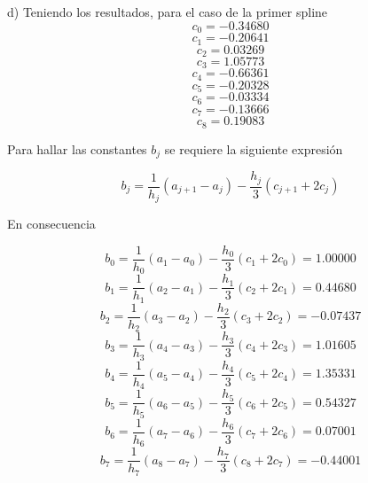 d) Teniendo los resultados, para el caso de la primer spline
\begin{equation}
    c_0 = -0.34680
\end{equation}
\begin{equation}
    c_1 = -0.20641
\end{equation}
\begin{equation}
    c_2 = 0.03269
\end{equation}
\begin{equation}
    c_3 = 1.05773
\end{equation}
\begin{equation}
    c_4 = -0.66361
\end{equation}
\begin{equation}
    c_5 = -0.20328
\end{equation}
\begin{equation}
    c_6 = -0.03334
\end{equation}
\begin{equation}
    c_7 = -0.13666
\end{equation}
\begin{equation}
    c_8 = 0.19083
\end{equation}

Para hallar las constantes $b_j$ se requiere la siguiente expresión

\begin{equation}
    b_j = \frac{1}{h_j}(a_{j+1}-a_j)-\frac{h_j}{3}(c_{j+1}+2c_j)
\end{equation}

En consecuencia

\begin{equation}
    b_0 = \frac{1}{h_0}(a_{1}-a_0)-\frac{h_0}{3}(c_{1}+2c_0)= 1.00000
\end{equation}
\begin{equation}
    b_1 = \frac{1}{h_1}(a_{2}-a_1)-\frac{h_1}{3}(c_{2}+2c_1)= 0.44680
\end{equation}
\begin{equation}
    b_2 = \frac{1}{h_2}(a_{3}-a_2)-\frac{h_2}{3}(c_{3}+2c_2)= -0.07437
\end{equation}
\begin{equation}
    b_3 = \frac{1}{h_3}(a_{4}-a_3)-\frac{h_3}{3}(c_{4}+2c_3)= 1.01605
\end{equation}
\begin{equation}
    b_4 = \frac{1}{h_4}(a_{5}-a_4)-\frac{h_4}{3}(c_{5}+2c_4)= 1.35331
\end{equation}
\begin{equation}
    b_5 = \frac{1}{h_5}(a_{6}-a_5)-\frac{h_5}{3}(c_{6}+2c_5)= 0.54327
\end{equation}
\begin{equation}
    b_6 = \frac{1}{h_6}(a_{7}-a_6)-\frac{h_6}{3}(c_{7}+2c_6)= 0.07001
\end{equation}
\begin{equation}
    b_7 = \frac{1}{h_7}(a_{8}-a_7)-\frac{h_7}{3}(c_{8}+2c_7)= -0.44001
\end{equation}

